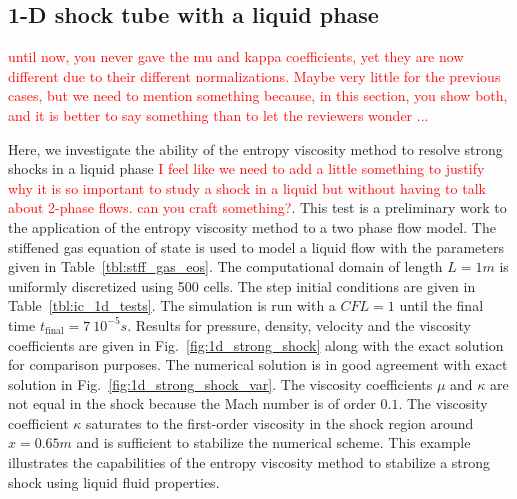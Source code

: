 \documentclass[preprint,10pt]{elsarticle}
\newcommand{\fig}[1]{Fig.~\ref{#1}}                      %
\newcommand{\tbl}[1]{Table~\ref{#1}}                     %
\newcommand{\tcr}[1]{\textcolor{red}{#1}}
\begin{document}
\subsection{1-D shock tube with a liquid phase} \label{sec:liquid_shock}
\tcr{until now, you never gave the mu and kappa coefficients, yet they are now different due to their different normalizations.
Maybe very little for the previous cases, but we need to mention something because, in this section, you show both, and it is better
to say something than to let the reviewers wonder ... }


Here, we investigate the ability of the entropy viscosity method to resolve strong shocks in a liquid phase \tcr{I feel like we need to add a little something to justify why it is so important to study a shock in a liquid but without having to talk about 2-phase flows. can you craft something?}. This test is a preliminary work to the application of the entropy viscosity method to a two phase flow model. The stiffened gas equation of state is used to model a liquid flow with the parameters given in \tbl{tbl:stff_gas_eos}. The computational domain of length $L=1m$ is uniformly discretized using 500 cells. The step initial conditions are given in \tbl{tbl:ic_1d_tests}.
%
The simulation is run with a $CFL=1$ until the final time $t_{\text{final}} = 7 \ 10^{-5}s$. Results for pressure, density, velocity and the viscosity coefficients are given in \fig{fig:1d_strong_shock} along with the exact solution for comparison purposes. The numerical solution is in good agreement with exact solution in \fig{fig:1d_strong_shock_var}. The viscosity coefficients $\mu$ and $\kappa$ are not equal in the shock because the Mach number is of order $0.1$. The viscosity coefficient $\kappa$ saturates to the first-order viscosity in the shock region around $x = 0.65m$ and is sufficient to stabilize the numerical scheme. This example illustrates the capabilities of the entropy viscosity method to stabilize a strong shock using liquid fluid properties. 
%
\end{document}
